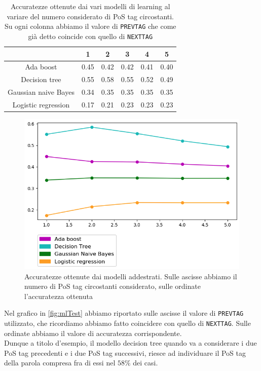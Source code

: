\documentclass[10pt]{article}
\begin{document}
\begin{enumerate}
	\begin{table}[!t]
		\centering
		\begin{tabular}{c|c|c|c|c|c}
			& 1 & 2 & 3 & 4 & 5\\
			\hline
			Ada boost & 0.45 & 0.42 & 0.42 & 0.41 & 0.40\\ 
            Decision tree & 0.55 & 0.58 & 0.55 & 0.52 & 0.49\\
            Gaussian naive Bayes & 0.34 & 0.35 & 0.35 & 0.35 & 0.35\\
            Logistic regression & 0.17 & 0.21 & 0.23 & 0.23 & 0.23\\
		\end{tabular}
		\caption{Accuratezze ottenute dai vari modelli di learning al variare del numero considerato di PoS tag circostanti. Su ogni colonna abbiamo il valore di \texttt{PREVTAG} che come già detto coincide con quello di \texttt{NEXTTAG}}
		\label{table: mlAccuracies}
	\end{table}
	
	\begin{figure}[!t]
		\centering
		\includegraphics[width=12cm]{Immagini/mlTest.png}
		\caption{Accuratezze ottenute dai modelli addestrati. Sulle ascisse abbiamo il numero di PoS tag circostanti considerato, sulle ordinate l'accuratezza ottenuta}
		\label{fig:mlTest}
	\end{figure}
	
	Nel grafico in \autoref{fig:mlTest} abbiamo riportato sulle ascisse il valore di \texttt{PREVTAG} utilizzato, che ricordiamo abbiamo fatto coincidere con quello di \texttt{NEXTTAG}. Sulle ordinate abbiamo il valore di accuratezza corrispondente.\\
	Dunque a titolo d'esempio, il modello decision tree quando va a considerare i due PoS tag precedenti e i due PoS tag successivi, riesce ad individuare il PoS tag della parola compresa fra di essi nel $58\%$ dei casi.
\end{enumerate}
\end{document}
